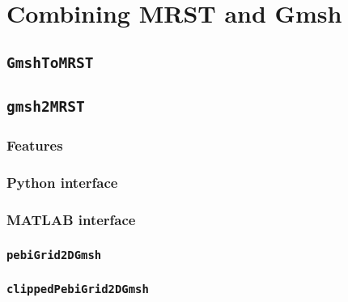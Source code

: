 \section{Combining MRST and Gmsh}
\label{sec:combining}

\subsection{\texttt{GmshToMRST}}

\subsection{\texttt{gmsh2MRST}}

\subsubsection{Features}

\subsubsection{Python interface}

\subsubsection{MATLAB interface}

\subsubsection{\texttt{pebiGrid2DGmsh}}

\subsubsection{\texttt{clippedPebiGrid2DGmsh}}

